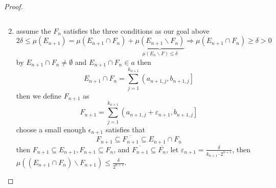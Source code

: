 \begin{proof}
\begin{enumerate}
\begin{equation}
		\end{equation}
		\item assume the ${F_n}$ satisfies  the three conditions as our goal above
		\begin{equation}
		2\delta  \leqslant \mu \left( {{E_{n + 1}}} \right) = \mu \left( {{E_{n + 1}} \cap {F_n}} \right) + \underbrace {\mu \left( {{E_{n + 1}}\backslash {F_n}} \right)}_{\mu \left( {{E_n}\backslash F} \right) \leqslant \delta } \Rightarrow \mu \left( {{E_{n + 1}} \cap {F_n}} \right) \geqslant \delta  > 0
		\label{eq7.12}
		\end{equation}
		by ${E_{n + 1}} \cap {F_n} \ne \emptyset $ and ${E_{n + 1}} \cap {F_n} \in a$ then
		\begin{equation}
		{E_{n + 1}} \cap {F_n} = \sum\limits_{j = 1}^{{k_{n + 1}}} {\left( {{a_{n + 1,j}},{b_{n + 1,j}}} \right]} 
		\label{eq7.13}
		\end{equation}
		then we define $ F_{n+1} $ as
		\begin{equation}
		{F_{n + 1}} = \sum\limits_{j = 1}^{{k_{n + 1}}} {\left( {{a_{n + 1,j}} + {\varepsilon _{n + 1}},{b_{n + 1,j}}} \right]} 
		\label{eq7.14}
		\end{equation}
		choose a small enough $ \epsilon_{n+1} $ satisfies that
		\begin{equation}
		{F_{n + 1}} \subseteq \overline {{F_{n + 1}}}  \subseteq {E_{n + 1}} \cap {F_n}
		\label{eq7.15}
		\end{equation}
		then ${F_{n + 1}} \subseteq {E_{n + 1}},{F_{n + 1}} \subseteq {F_n}$, and $\overline {{F_{n + 1}}}  \subseteq \overline {{F_n}} $, let ${\varepsilon _{n + 1}} = \frac{\delta }{{{k_{n + 1}} \cdot {2^{n + 1}}}}$, then $\mu \left( {\left( {{E_{n + 1}} \cap {F_n}} \right)\backslash {F_{n + 1}}} \right) \leqslant \frac{\delta }{{{2^{n + 1}}}}$. 
		

\end{enumerate}
\end{proof}
